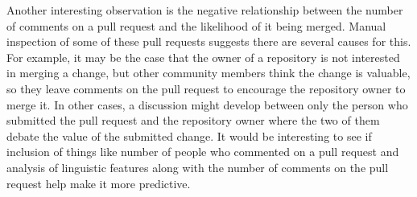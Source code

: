 \documentclass[12pt]{article}
\begin{document}
Another interesting observation is the negative relationship between the number
of comments on a pull request and the likelihood of it being merged. Manual
inspection of some of these pull requests suggests there are several causes for
this. For example, it may be the case that the owner of a repository is not
interested in merging a change, but other community members think the change is
valuable, so they leave comments on the pull request to encourage the repository
owner to merge it. In other cases, a discussion might develop between only the
person who submitted the pull request and the repository owner where the two of
them debate the value of the submitted change. It would be interesting to see if
inclusion of things like number of people who commented on a pull request and
analysis of linguistic features along with the number of comments on the pull
request help make it more predictive.



\end{document}
